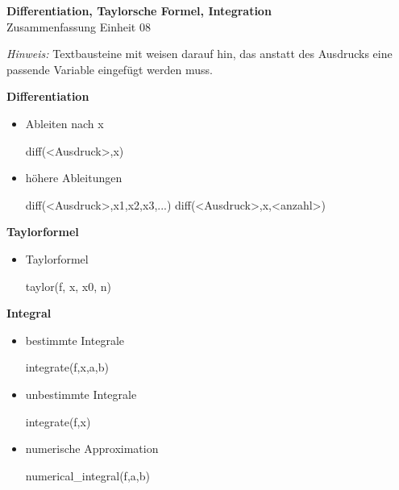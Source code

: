 \documentclass[a4paper,9pt,DIV15,twocolumn]{scrartcl}
\begin{document}
\begin{center}
    \textbf{\LARGE Differentiation, Taylorsche Formel, Integration}\\
    {\large Zusammenfassung Einheit 08}
\end{center}
\textsl{Hinweis:} Textbausteine mit  weisen darauf hin, das anstatt des Ausdrucks eine passende Variable eingefügt werden muss.

\medskip

\textbf{Differentiation}

\begin{itemize}
 \item Ableiten nach x
\begin{sagein}
diff(<Ausdruck>,x) 
\end{sagein}
\item höhere Ableitungen
\begin{sagein}
diff(<Ausdruck>,x1,x2,x3,...)
diff(<Ausdruck>,x,<anzahl>) 
\end{sagein}
\end{itemize}


\textbf{Taylorformel}

\begin{itemize}
 \item Taylorformel
\begin{sagein}
taylor(f, x, x0, n)
\end{sagein}
\end{itemize}

\textbf{Integral}

\begin{itemize}
 \item bestimmte Integrale
\begin{sagein}
integrate(f,x,a,b) 
\end{sagein}
\item unbestimmte Integrale
\begin{sagein}
integrate(f,x)
\end{sagein}
\item numerische Approximation
\begin{sagein}
numerical_integral(f,a,b) 
\end{sagein}
\end{itemize}
\end{document}
